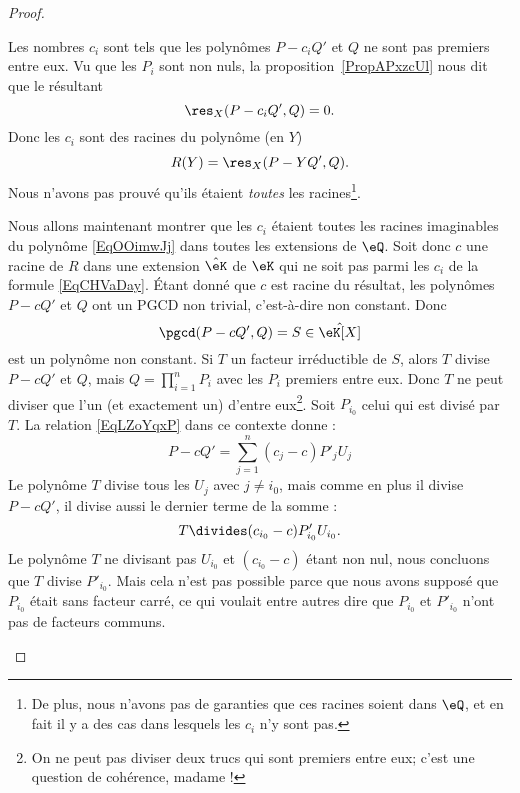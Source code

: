\begin{proof}
\begin{subproof}
		Les nombres \( c_i\) sont tels que les polynômes \( P-c_iQ'\) et \( Q\) ne sont pas premiers entre eux. Vu que les \( P_i\) sont non nuls, la proposition~\ref{PropAPxzcUl} nous dit que le résultant
		\begin{equation}
			\res_X(P-c_iQ',Q)=0.
		\end{equation}
		Donc les \( c_i\) sont des racines du polynôme (en \( Y\))
		\begin{equation}    \label{EqOOimwJj}
			R(Y)=\res_X(P-YQ',Q).
		\end{equation}
		Nous n'avons pas prouvé qu'ils étaient \emph{toutes} les racines\footnote{De plus, nous n'avons pas de garanties que ces racines soient dans \( \eQ\), et en fait il y a des cas dans lesquels les \( c_i\) n'y sont pas.}.


		Nous allons maintenant montrer que les \( c_i\) étaient toutes les racines imaginables du polynôme \eqref{EqOOimwJj} dans toutes les extensions de \( \eQ\). Soit donc \( c\) une racine de \( R\) dans une extension \( \hat \eK\) de \( \eK\) qui ne soit pas parmi les \( c_i\) de la formule \eqref{EqCHVaDay}. Étant donné que \( c\) est racine du résultat, les polynômes \( P-cQ'\) et \( Q\) ont un PGCD non trivial, c'est-à-dire non constant. Donc
		\begin{equation}
			\pgcd(P-cQ',Q)=S\in \hat\eK[X]
		\end{equation}
		est un polynôme non constant. Si \( T\) un facteur irréductible de \( S\), alors \( T\) divise \( P-cQ'\) et \( Q\), mais \( Q=\prod_{i=1}^nP_i\) avec les \( P_i\) premiers entre eux. Donc \( T\) ne peut diviser que l'un (et exactement un) d'entre eux\footnote{On ne peut pas diviser deux trucs qui sont premiers entre eux; c'est une question de cohérence, madame !}. Soit \( P_{i_0}\) celui qui est divisé par \( T\). La relation \eqref{EqLZoYqxP} dans ce contexte donne :
		\begin{equation}
			P-cQ'=\sum_{j=1}^n(c_j-c)P'_jU_j
		\end{equation}
		Le polynôme \( T\) divise tous les \( U_j\) avec \( j\neq i_0\), mais comme en plus il divise \( P-cQ'\), il divise aussi le dernier terme de la somme :
		\begin{equation}
			T\divides (c_{i_0}-c)P'_{i_0}U_{i_0}.
		\end{equation}
		Le polynôme \( T\) ne divisant pas \( U_{i_0}\) et \(  (c_{i_0}-c)  \) étant non nul, nous concluons que \( T\) divise \( P'_{i_0}\). Mais cela n'est pas possible parce que nous avons supposé que \( P_{i_0}\) était sans facteur carré, ce qui voulait entre autres dire que \( P_{i_0}\) et \( P'_{i_0}\) n'ont pas de facteurs communs.

	\end{subproof}
\end{proof}

